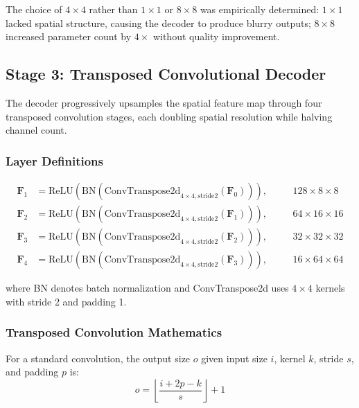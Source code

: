 \documentclass[12pt,a4paper,oneside]{report}
\begin{document}
The choice of $4 \times 4$ rather than $1 \times 1$ or $8 \times 8$ was empirically determined: $1 \times 1$ lacked spatial structure, causing the decoder to produce blurry outputs; $8 \times 8$ increased parameter count by $4\times$ without quality improvement.

\subsection{Stage 3: Transposed Convolutional Decoder}
\label{subsec:stage_3_transposed_convolutional_decoder}

The decoder progressively upsamples the spatial feature map through four transposed convolution stages, each doubling spatial resolution while halving channel count.

\subsubsection{Layer Definitions}
\label{subsubsec:layer_definitions}

\begin{align}
\mathbf{F}_1 &= \text{ReLU}(\text{BN}(\text{ConvTranspose2d}_{4\times4,\text{stride}2}(\mathbf{F}_0))), &\quad &128 \times 8 \times 8 \\
\mathbf{F}_2 &= \text{ReLU}(\text{BN}(\text{ConvTranspose2d}_{4\times4,\text{stride}2}(\mathbf{F}_1))), &\quad &64 \times 16 \times 16 \\
\mathbf{F}_3 &= \text{ReLU}(\text{BN}(\text{ConvTranspose2d}_{4\times4,\text{stride}2}(\mathbf{F}_2))), &\quad &32 \times 32 \times 32 \\
\mathbf{F}_4 &= \text{ReLU}(\text{BN}(\text{ConvTranspose2d}_{4\times4,\text{stride}2}(\mathbf{F}_3))), &\quad &16 \times 64 \times 64
\end{align}

where BN denotes batch normalization and ConvTranspose2d uses $4 \times 4$ kernels with stride 2 and padding 1.

\subsubsection{Transposed Convolution Mathematics}
\label{subsubsec:transposed_convolution_mathematics}

For a standard convolution, the output size $o$ given input size $i$, kernel $k$, stride $s$, and padding $p$ is:
\begin{equation}
o = \left\lfloor \frac{i + 2p - k}{s} \right\rfloor + 1
\end{equation}
\end{document}
